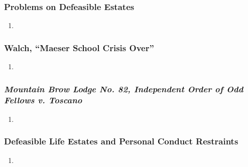 \subsubsection{Problems on Defeasible Estates}

\begin{enumerate}
    \item %
\end{enumerate}

\subsubsection{Walch, ``Maeser School Crisis Over''}

\begin{enumerate}
    \item %
\end{enumerate}

\subsubsection{\emph{Mountain Brow Lodge No. 82, Independent Order of Odd 
Fellows v. Toscano}}

\begin{enumerate}
    \item %
\end{enumerate}

\subsubsection{Defeasible Life Estates and Personal Conduct Restraints}

\begin{enumerate}
    \item %
\end{enumerate}
